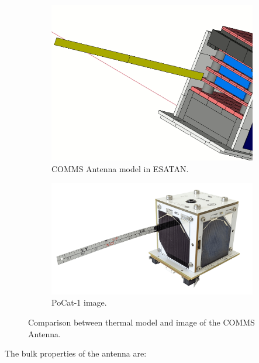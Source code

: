 \begin{figure}[H]
  \centering
  \begin{subfigure}{.5\textwidth}
    \centering
    \includegraphics[width=.5\linewidth]{res/img/5_simulationanalisys/Comparisons/ESATAN/commsantenna.PNG}
    \caption{COMMS Antenna model in ESATAN.}
    \label{fig:commsantenna}
  \end{subfigure}%
  \begin{subfigure}{.5\textwidth}
    \centering
    \includegraphics[width=.5\linewidth]{res/img/5_simulationanalisys/Comparisons/SLDW/commsantenna.png}
    \caption{PoCat-1 image.}
    \label{fig:commsantennasolid}
  \end{subfigure}
  \caption{Comparison between thermal model and image of the COMMS Antenna.}
  \label{fig:commsantennaim}
\end{figure}

The bulk properties of the antenna are:

\begin{table}[H]
  \centering
  \caption{Bulk properties of the COMMS Antenna.}
\end{table}

